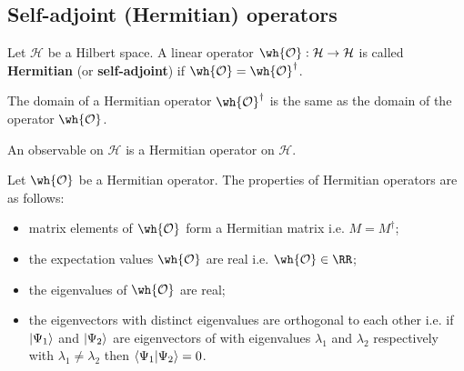 \documentclass[12pt, a4paper]{article}
\begin{document}
\subsection{Self-adjoint (Hermitian) operators}

\begin{definition}
    Let \(\mathcal{H}\) be a Hilbert space. A linear operator \(\wh{\mathcal{O}} : \mathcal{H} \to \mathcal{H}\) is called \textbf{Hermitian} (or \textbf{self-adjoint}) if \(\wh{\mathcal{O}} = {\wh{\mathcal{O}}}^{\dagger}\).
\end{definition}

\begin{mdremark}
    The domain of a Hermitian operator \(\wh{\mathcal{O}}^{\dagger}\) is the same as the domain of the operator \(\wh{\mathcal{O}}\).
\end{mdremark}

\begin{definition}
    An observable on \(\mathcal{H}\) is a Hermitian operator on \(\mathcal{H}\).
\end{definition}

\begin{mdthm}
    Let \(\wh{\mathcal{O}}\) be a Hermitian operator. The properties of Hermitian operators are as follows:
    \begin{itemize}
        \item matrix elements of \(\wh{\mathcal{O}}\) form a Hermitian matrix i.e. \(M=M^{\dagger}\);
        \item the expectation values \(\wh{\mathcal{O}}\) are real i.e. \(\wh{\mathcal{O}} \in \RR\);
        \item the eigenvalues of \(\wh{\mathcal{O}}\) are real;
        \item the eigenvectors with distinct eigenvalues are orthogonal to each other i.e. if \(\ket{\Psi_1}\) and \(\ket{\Psi_2}\) are eigenvectors of with eigenvalues \(\lambda_1\) and \(\lambda_2\) respectively with \(\lambda_1 \neq \lambda_2\) then \(\bra{\Psi_1} \ket{\Psi_2} =0\).
    \end{itemize}
\end{mdthm}
\end{document}
